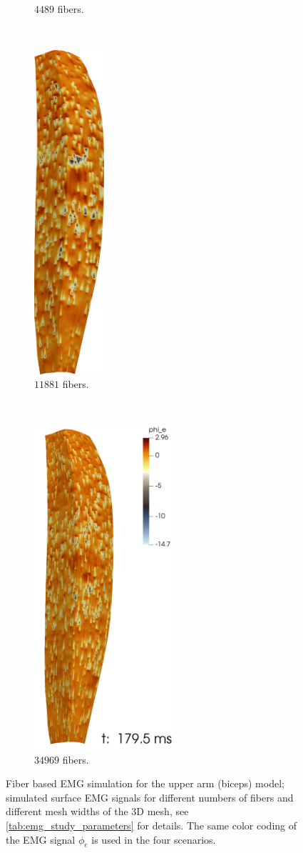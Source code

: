 \begin{figure}
\begin{subfigure}[t]{0.19\textwidth}
    \caption{$4489$ fibers.}%
    \label{fig:emg67}%
  \end{subfigure}  \,
  \begin{subfigure}[t]{0.19\textwidth}%
    \centering%
    \includegraphics[height=12cm]{images/results/application/emg109.png}%
    \caption{$\num{11881}$ fibers.}%
    \label{fig:emg109}%
  \end{subfigure}    \,
  \begin{subfigure}[t]{0.35\textwidth}%
    \centering%
    \includegraphics[height=12cm]{images/results/application/emg187.png}%
    \caption{$\num{34969}$ fibers.}%
    \label{fig:emg187}%
  \end{subfigure}   
  \caption{Fiber based EMG simulation for the upper arm (biceps) model; simulated surface EMG signals for different numbers of fibers and different mesh widths of the 3D mesh, see \cref{tab:emg_study_parameters} for details. The same color coding of the EMG signal $\phi_e$ is used in the four scenarios.}%
  \label{fig:emg_hpc}%
\end{figure}%

